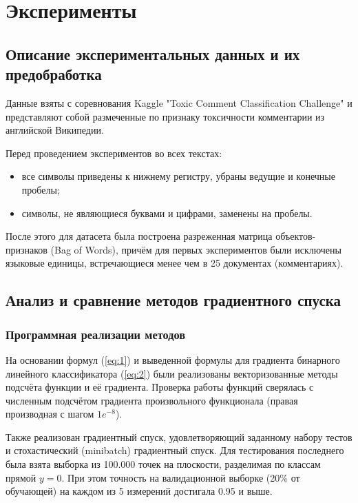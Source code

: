 \documentclass{article}
\begin{document}
    \section{Эксперименты}
        \subsection{Описание экспериментальных данных и их предобработка}
            Данные взяты с соревнования Kaggle "Toxic Comment Classification Challenge" и представляют собой размеченные по признаку токсичности комментарии из английской Википедии.

            Перед проведением экспериментов во всех текстах:
            \begin{itemize}
                \item все символы приведены к нижнему регистру, убраны ведущие и конечные пробелы;
                \item символы, не являющиеся буквами и цифрами, заменены на пробелы.
            \end{itemize}

            После этого для датасета была построена разреженная матрица объектов-признаков (Bag of Words), причём для первых экспериментов были исключены языковые единицы, встречающиеся менее чем в 25 документах (комментариях).
        \subsection{Анализ и сравнение методов градиентного спуска}
            \subsubsection{Программная реализации методов}
                На основании формул (\ref{eq:1}) и выведенной формулы для градиента бинарного линейного классификатора (\ref{eq:2}) были реализованы векторизованные методы подсчёта функции и её градиента. Проверка работы функций сверялась с численным подсчётом градиента произвольного функционала (правая производная с шагом $1e^{-8}$).
                
                Также реализован градиентный спуск, удовлетворяющий заданному набору тестов и стохастический (minibatch) градиентный спуск. Для тестирования последнего была взята выборка из 100.000 точек на плоскости, разделимая по классам прямой $y = 0$. При этом точность на валидационной выборке (20\% от обучающей) на каждом из 5 измерений достигала 0.95 и выше.
\end{document}
